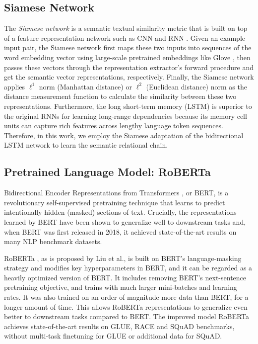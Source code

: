 \documentclass[pdflatex,sn-mathphys]{sn-jnl}%
\theoremstyle{thmstyleone}%
\theoremstyle{thmstyletwo}%
\theoremstyle{thmstylethree}%
\begin{document}
\subsection{Siamese Network}
The \textit{Siamese network} \cite{sia2016jonas} is a semantic textual similarity metric that is built on top of a feature representation network such as CNN \cite{yanlecun2005cnnsia} and RNN \cite{sia2016jonas}. Given an example input pair, the Siamese network first maps these two inputs into sequences of the word embedding vector using large-scale pretrained embeddings like Glove \cite{jeffrey2014glove}, then passes these vectors through the representation extractor's forward procedure and get the semantic vector representations, respectively. Finally, the Siamese network applies $\ell^{1}$ norm (Manhattan distance) or $\ell^{2}$ (Euclidean distance) norm as the distance measurement function to calculate the similarity between these two representations. Furthermore, the long short-term memory (LSTM) is superior to the original RNNs for learning long-range dependencies because its memory cell units can capture rich features across lengthy language token sequences. Therefore, in this work, we employ the Siamese adaptation of the bidirectional LSTM network to learn the semantic relational chain. 

\subsection{Pretrained Language Model: RoBERTa}
Bidirectional Encoder Representations from Transformers \cite{google2018bert}, or BERT, is a revolutionary self-supervised pretraining technique that learns to predict intentionally hidden (masked) sections of text. Crucially, the representations learned by BERT have been shown to generalize well to downstream tasks and, when BERT was first released in 2018, it achieved state-of-the-art results on many NLP benchmark datasets.

RoBERTa \cite{roberta}, as is proposed by Liu et al., is built on BERT’s language-masking strategy and modifies key hyperparameters in BERT, and it can be regarded as a heavily optimized version of BERT. It includes removing BERT’s next-sentence pretraining objective, and trains with much larger mini-batches and learning rates. It was also trained on an order of magnitude more data than BERT, for a longer amount of time. This allows RoBERTa representations to generalize even better to downstream tasks compared to BERT. The improved model RoBERTa achieves state-of-the-art results on GLUE, RACE and SQuAD benchmarks, without multi-task finetuning for GLUE or additional data for SQuAD.
\end{document}
